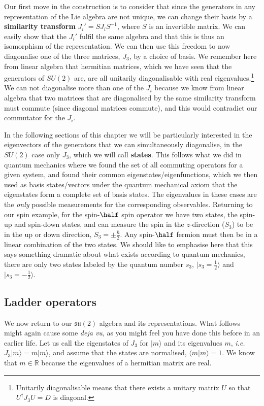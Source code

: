 \documentclass[notes.tex]{subfiles}
\begin{document}
Our first move in the construction is to consider that since the generators in any representation of the Lie algebra are not unique, we can change their basis by a {\bf similarity transform} $J_i'=SJ_iS^{-1}$, where $S$ is an invertible matrix. We can easily show that the $J_i'$ fulfil the same algebra and that this is thus an isomorphism of the representation. We can then use this freedom to now diagonalise one of the three matrices, $J_3$, by a choice of basis.  We remember here from linear algebra that hermitian matrices, which we have seen that the generators of $SU(2)$ are, are all unitarily diagonalisable with real eigenvalues.\footnote{Unitarily diagonalisable means that there exists a unitary matrix $U$ so that $U^\dagger J_3 U = D$ is diagonal.}  We can not diagonalise more than one of the $J_i$ because we know from linear algebra that two matrices that are diagonalised by the same similarity transform must commute (since diagonal matrices commute), and this would contradict our commutator for the $J_i$. 

In the following sections of this chapter we will be particularly interested in the eigenvectors of the generators that we can simultaneously diagonalise, in the $SU(2)$ case only $J_3$, which we will call {\bf states}. This follows what we did in quantum mechanics where we found the set of all commuting operators for a given system, and found their common eigenstates/eigenfunctions, which we then used as basis states/vectors under the quantum mechanical axiom that the eigenstates form a complete set of basis states. The eigenvalues in these cases are the {\it only} possible measurements for the corresponding observables. Returning to our spin example, for the spin-$\half$ spin operator we have two states, the spin-up and spin-down states, and can measure the spin in the $z$-direction ($S_3$) to be in the up or down direction, $S_3=\pm\frac{\hbar}{2}$. Any spin-$\half$ fermion must then be in a linear combination of the two states. We should like to emphasise here that this says something dramatic about what exists according to quantum mechanics, there are only two states labeled by the quantum number $s_3$, $|s_3=\frac{1}{2}\rangle$ and $|s_3=-\frac{1}{2}\rangle$.


\subsection{Ladder operators}
We now return to our $\mathfrak{su}(2)$ algebra and its representations. What follows might again cause some {\it deja vu}, as you might feel you have done this before in an earlier life. Let us call the eigenstates of $J_3$ for $|m\rangle$ and its eigenvalues $m$, {\it i.e.}\ $J_3|m\rangle=m|m\rangle$, and assume that the states are normalised, $\langle m|m\rangle=1$. We know that $m\in\mathbb R$ because the eigenvalues of a hermitian matrix are real.
\end{document}
